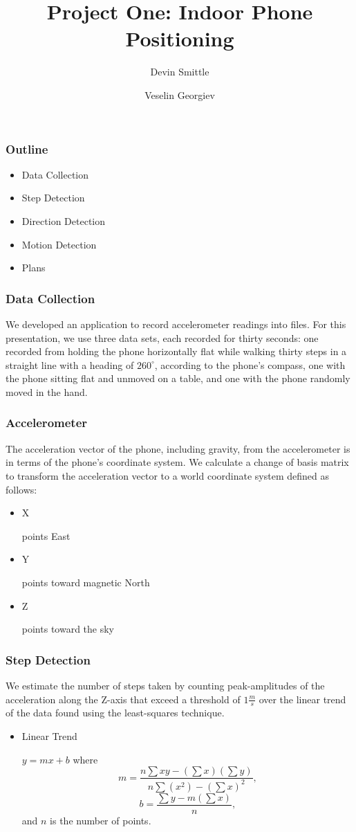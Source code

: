 \documentclass{beamer}
\begin{document}
\title{Project One: Indoor Phone Positioning}
\author{Devin Smittle \and Veselin Georgiev}

\frame{\titlepage}

\begin{frame}
  \frametitle{Outline}
  \begin{itemize}
  \item Data Collection
  \item Step Detection
  \item Direction Detection
  \item Motion Detection
  \item Plans
  \end{itemize}
\end{frame}

\begin{frame}
  \frametitle{Data Collection}
  We developed an application to record accelerometer readings into
  files. For this presentation, we use three data sets, each recorded
  for thirty seconds: one recorded from holding the phone horizontally
  flat while walking thirty steps in a straight line with a heading of
  $260^{\circ}$, according to the phone's compass, one with the phone
  sitting flat and unmoved on a table, and one with the phone randomly
  moved in the hand.

\end{frame}

\begin{frame}
  \frametitle{Accelerometer}
  The acceleration vector of the phone, including gravity, from the
  accelerometer is in terms of the phone's coordinate system.  We
  calculate a change of basis matrix to transform the acceleration
  vector to a world coordinate system defined as follows:
  
  \begin{itemize}
  \item X
 
    points East
  \item Y

    points toward magnetic North
  \item Z

    points toward the sky
  \end{itemize}
\end{frame}

\begin{frame}
  \frametitle{Step Detection}
  We estimate the number of steps taken by counting peak-amplitudes of
  the acceleration along the Z-axis that exceed a threshold of $1
  \frac{m}{s}$ over the linear trend of the data found using the
  least-squares technique.

  \begin{itemize}
  \item Linear Trend
    
    $y = mx + b$ where
    \[
    m = \frac{n\sum{xy} - \left(\sum{x}\right)\left(\sum{y}\right)}
    {n\sum{(x^2)} - \left(\sum{x}\right)^2},
    \]
    \[
    b = \frac{\sum{y} - m\left(\sum{x}\right)}{n},
    \] and $n$ is the number of points.
  \end{itemize}
\end{frame}
\end{document}
